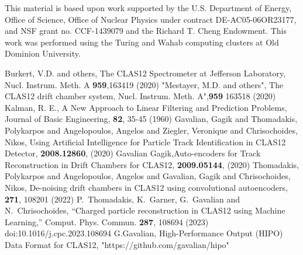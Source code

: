 \documentclass[a4paper,11pt]{article}
\begin{document}
\acknowledgments

This material is based upon work supported by the U.S. Department of Energy, Office of Science, Office of Nuclear Physics under contract DE-AC05-06OR23177, and
 NSF grant no. CCF-1439079 and the Richard T. Cheng Endowment. This work was performed using the Turing and  Wahab computing clusters at Old Dominion University.
 
 \begin{thebibliography}{}
%
%
Burkert, V.D. and others, The CLAS12 Spectrometer at Jefferson Laboratory, Nucl. Instrum. Meth. A \textbf{959},163419 (2020)
 "Mestayer, M.D. and others", The CLAS12 drift chamber system, Nucl. Instrum. Meth. A",\textbf{959} 163518 (2020)
  Kalman, R. E., A New Approach to Linear Filtering and Prediction Problems, Journal of Basic Engineering, \textbf{82}, 35-45 (1960)
Gavalian, Gagik and Thomadakis, Polykarpos and Angelopoulos, Angelos and Ziegler, Veronique and Chrisochoides, Nikos, Using Artificial Intelligence for Particle Track Identification in CLAS12 Detector, \textbf{2008.12860}, (2020)
 Gavalian Gagik,Auto-encoders for Track Reconstruction in Drift Chambers for CLAS12, \textbf{2009.05144}, (2020)
   Thomadakis, Polykarpos and Angelopoulos, Angelos and Gavalian, Gagik and Chrisochoides, Nikos, De-noising drift chambers in CLAS12 using convolutional autoencoders, \textbf{271}, 108201 (2022)   
P.~Thomadakis, K.~Garner, G.~Gavalian and N.~Chrisochoides,
``Charged particle reconstruction in CLAS12 using Machine Learning,''
Comput. Phys. Commun. \textbf{287}, 108694 (2023) doi:10.1016/j.cpc.2023.108694
  G.Gavalian, High-Performance Output (HIPO) Data Format for CLAS12,  "https://github.com/gavalian/hipo"
\end{thebibliography}

%
%
\end{document}
